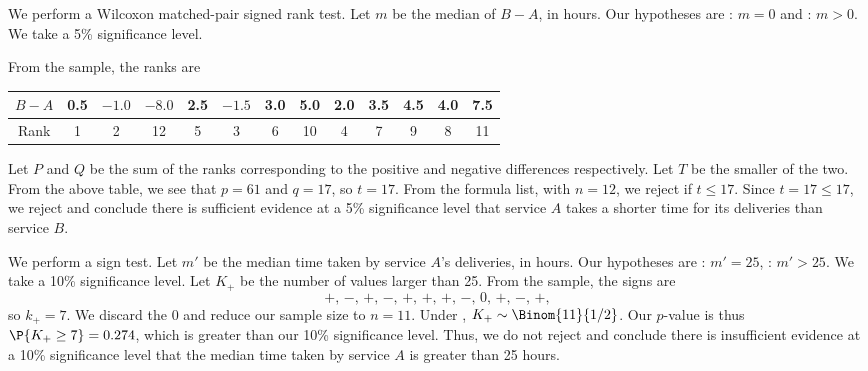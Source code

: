 \begin{solution}
    \begin{ppart}
        We perform a Wilcoxon matched-pair signed rank test. Let $m$ be the median of $B-A$, in hours. Our hypotheses are \nullhyp: $m = 0$ and \althyp: $m > 0$. We take a 5\% significance level. 

        From the sample, the ranks are
        \begin{table}[H]
            \centering
            \begin{tabular}{|c|c|c|c|c|c|c|c|c|c|c|c|c|}
            \hline
            $B - A$ & 0.5 & $-1.0$ & $-8.0$ & 2.5 & $-1.5$ & 3.0 & 5.0 & 2.0 & 3.5 & 4.5 & 4.0 & 7.5 \\ \hline
            Rank & 1 & 2 & 12 & 5 & 3 & 6 & 10 & 4 & 7 & 9 & 8 & 11 \\ \hline
            \end{tabular}
        \end{table}

        Let $P$ and $Q$ be the sum of the ranks corresponding to the positive and negative differences respectively. Let $T$ be the smaller of the two. From the above table, we see that $p = 61$ and $q = 17$, so $t = 17$. From the formula list, with $n = 12$, we reject \nullhyp{} if $t \leq 17$. Since $t = 17 \leq 17$, we reject \nullhyp{} and conclude there is sufficient evidence at a 5\% significance level that service $A$ takes a shorter time for its deliveries than service $B$.
    \end{ppart}
    \begin{ppart}
        We perform a sign test. Let $m'$ be the median time taken by service $A$'s deliveries, in hours. Our hypotheses are \nullhyp: $m' = 25$, \althyp: $m' > 25$. We take a 10\% significance level. Let $K_+$ be the number of values larger than 25. From the sample, the signs are \[+, \, -, \, +, \, -, \, +, \, +, \, +, \, -, \, 0, \, +, \, -, \, +,\] so $k_+ = 7$. We discard the 0 and reduce our sample size to $n = 11$. Under \nullhyp, $K_+ \sim \Binom{11}{1/2}$. Our $p$-value is thus $\P{K_+ \geq 7} = 0.274$, which is greater than our 10\% significance level. Thus, we do not reject \nullhyp{} and conclude there is insufficient evidence at a 10\% significance level that the median time taken by service $A$ is greater than 25 hours.
    \end{ppart}
\end{solution}

